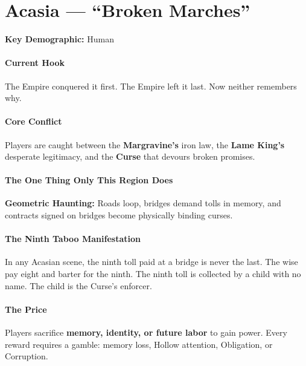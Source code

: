 \section{Acasia --- ``Broken Marches''}
\label{chap:acasia}

\textbf{Key Demographic: } Human 

\begin{tcolorbox}[colback=black!5,colframe=blue!60!black,title={Region Diagnostic Summary},breakable]
\paragraph*{Current Hook}
The Empire conquered it first. The Empire left it last. Now neither remembers why.

\paragraph*{Core Conflict}
Players are caught between the \textbf{Margravine's} iron law, the \textbf{Lame King's} desperate legitimacy, and the \textbf{Curse} that devours broken promises.

\paragraph*{The One Thing Only This Region Does}
\textbf{Geometric Haunting:} Roads loop, bridges demand tolls in memory, and contracts signed on bridges become physically binding curses.

\paragraph*{The Ninth Taboo Manifestation}
In any Acasian scene, the ninth toll paid at a bridge is never the last. The wise pay eight and barter for the ninth. The ninth toll is collected by a child with no name. The child is the Curse's enforcer.

\paragraph*{The Price}
Players sacrifice \textbf{memory, identity, or future labor} to gain power. Every reward requires a gamble: memory loss, Hollow attention, Obligation, or Corruption.


\end{tcolorbox}
